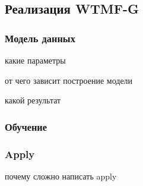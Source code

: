 \subsection{Реализация WTMF-G}
    \subsubsection{Модель данных}
        какие параметры

        от чего зависит построение модели

        какой результат

    \subsubsection{Обучение}

    \subsubsection{Apply}
        почему сложно написать apply